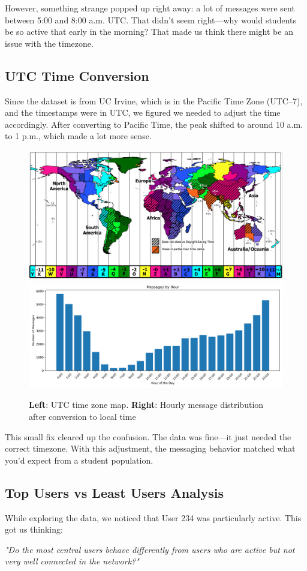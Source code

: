 However, something strange popped up right away: a lot of messages were sent between 5:00 and 8:00 a.m. UTC. That didn't seem right—why would students be so active that early in the morning? That made us think there might be an issue with the timezone.

\subsection{UTC Time Conversion}

Since the dataset is from UC Irvine, which is in the Pacific Time Zone (UTC--7), and the timestamps were in UTC, we figured we needed to adjust the time accordingly. After converting to Pacific Time, the peak shifted to around 10 a.m. to 1 p.m., which made a lot more sense.

\begin{figure}[H]
    \centering
    \includegraphics[width=0.3\linewidth]{../Images/UTCmap.png}
    \hspace{10pt}
    \includegraphics[width=0.35\linewidth]{../Images/messages_by_hour.png}
    \caption{\textbf{Left}: UTC time zone map. \textbf{Right}: Hourly message distribution after conversion to local time}
    \label{fig:hourly-after-conversion}
\end{figure}

This small fix cleared up the confusion. The data was fine—it just needed the correct timezone. With this adjustment, the messaging behavior matched what you'd expect from a student population.

\subsection{Top Users vs Least Users Analysis}

While exploring the data, we noticed that User 234 was particularly active. This got us thinking:

\textit{"Do the most central users behave differently from users who are active but not very well connected in the network?"}

